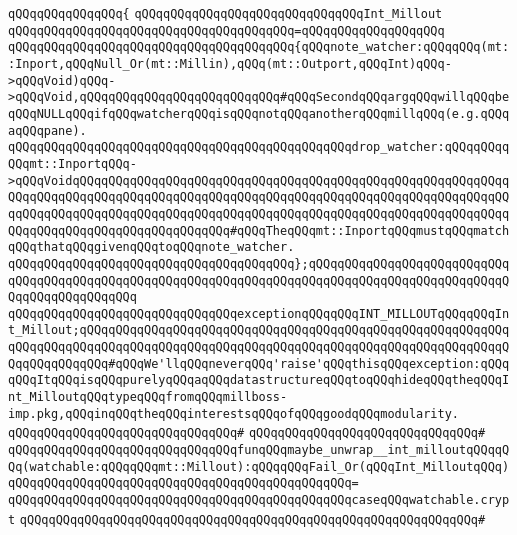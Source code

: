 \verb|qQQqqQQqqQQqqQQq{|\newline
\verb|qQQqqQQqqQQqqQQqqQQqqQQqqQQqqQQqInt_Millout|\newline
\verb|qQQqqQQqqQQqqQQqqQQqqQQqqQQqqQQqqQQqqQQq=qQQqqQQqqQQqqQQqqQQq|\newline
\verb|qQQqqQQqqQQqqQQqqQQqqQQqqQQqqQQqqQQqqQQq{qQQqnote_watcher:qQQqqQQq(mt::Inport,qQQqNull_Or(mt::Millin),qQQq(mt::Outport,qQQqInt)qQQq->qQQqVoid)qQQq->qQQqVoid,qQQqqQQqqQQqqQQqqQQqqQQqqQQq#qQQqSecondqQQqargqQQqwillqQQqbeqQQqNULLqQQqifqQQqwatcherqQQqisqQQqnotqQQqanotherqQQqmillqQQq(e.g.qQQqaqQQqpane).|\newline
\verb|qQQqqQQqqQQqqQQqqQQqqQQqqQQqqQQqqQQqqQQqqQQqqQQqdrop_watcher:qQQqqQQqqQQqmt::InportqQQq->qQQqVoidqQQqqQQqqQQqqQQqqQQqqQQqqQQqqQQqqQQqqQQqqQQqqQQqqQQqqQQqqQQqqQQqqQQqqQQqqQQqqQQqqQQqqQQqqQQqqQQqqQQqqQQqqQQqqQQqqQQqqQQqqQQqqQQqqQQqqQQqqQQqqQQqqQQqqQQqqQQqqQQqqQQqqQQqqQQqqQQqqQQqqQQqqQQqqQQqqQQqqQQqqQQqqQQqqQQqqQQqqQQqqQQqqQQqqQQq#qQQqTheqQQqmt::InportqQQqmustqQQqmatchqQQqthatqQQqgivenqQQqtoqQQqnote_watcher.|\newline
\verb|qQQqqQQqqQQqqQQqqQQqqQQqqQQqqQQqqQQqqQQq};qQQqqQQqqQQqqQQqqQQqqQQqqQQqqQQqqQQqqQQqqQQqqQQqqQQqqQQqqQQqqQQqqQQqqQQqqQQqqQQqqQQqqQQqqQQqqQQqqQQqqQQqqQQqqQQqqQQq|\newline
\newline
\verb|qQQqqQQqqQQqqQQqqQQqqQQqqQQqqQQqexceptionqQQqqQQqINT_MILLOUTqQQqqQQqInt_Millout;qQQqqQQqqQQqqQQqqQQqqQQqqQQqqQQqqQQqqQQqqQQqqQQqqQQqqQQqqQQqqQQqqQQqqQQqqQQqqQQqqQQqqQQqqQQqqQQqqQQqqQQqqQQqqQQqqQQqqQQqqQQqqQQqqQQqqQQqqQQqqQQq#qQQqWe'llqQQqneverqQQq'raise'qQQqthisqQQqexception:qQQqqQQqItqQQqisqQQqpurelyqQQqaqQQqdatastructureqQQqtoqQQqhideqQQqtheqQQqInt_MilloutqQQqtypeqQQqfromqQQqmillboss-imp.pkg,qQQqinqQQqtheqQQqinterestsqQQqofqQQqgoodqQQqmodularity.|\newline
\verb|qQQqqQQqqQQqqQQqqQQqqQQqqQQqqQQq#|\newline
\verb|qQQqqQQqqQQqqQQqqQQqqQQqqQQqqQQq#|\newline
\verb|qQQqqQQqqQQqqQQqqQQqqQQqqQQqqQQqfunqQQqmaybe_unwrap__int_milloutqQQqqQQq(watchable:qQQqqQQqmt::Millout):qQQqqQQqFail_Or(qQQqInt_MilloutqQQq)|\newline
\verb|qQQqqQQqqQQqqQQqqQQqqQQqqQQqqQQqqQQqqQQqqQQqqQQq=|\newline
\verb|qQQqqQQqqQQqqQQqqQQqqQQqqQQqqQQqqQQqqQQqqQQqqQQqcaseqQQqwatchable.crypt|\newline
\verb|qQQqqQQqqQQqqQQqqQQqqQQqqQQqqQQqqQQqqQQqqQQqqQQqqQQqqQQqqQQqqQQq#|\newline
